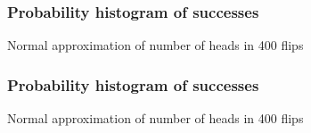\documentclass[handout]{beamer}
\begin{document}


   \begin{frame}
   \frametitle{Probability histogram of successes}
   \begin{center}
   \end{center}
   Normal approximation of number of heads in 400 flips
   \end{frame}



   \begin{frame}
   \frametitle{Probability histogram of successes}
   \begin{center}
   \end{center}
   Normal approximation of number of heads in 400 flips
   \end{frame}
\end{document}
